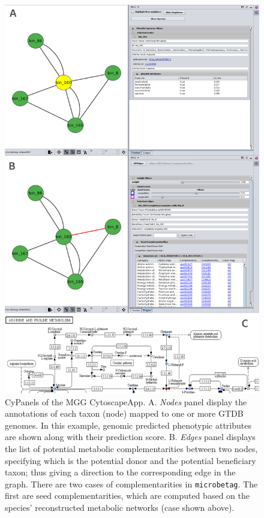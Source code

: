 \documentclass[sn-mathphys,Numbered]{sn-jnl}  %
\theoremstyle{thmstyleone}%
\theoremstyle{thmstyletwo}%
\theoremstyle{thmstylethree}%
\newcommand{\microbetag}{\texttt{microbetag}}
\begin{document}
        \newpage
        \begin{figure}[H]
            \centering
            \includegraphics*[width=0.85\columnwidth]{figs/cyPanel.png}
            \caption{
                CyPanels of the MGG CytoscapeApp. 
                A. \textit{Nodes} panel display the annotations of each taxon (node) mapped to one or more GTDB genomes.
                In this example, genomic predicted phenotypic attributes are shown along with their prediction score.
                B. \textit{Edges} panel displays the list of potential metabolic complementarities between two nodes, specifying which is the potential donor and the potential beneficiary taxon; thus giving a direction to the corresponding edge in the graph. 
                There are two cases of complementarities in \microbetag.
                The first are seed complementarities, which are computed based on the species' reconstructed metabolic networks (case shown above). 
}
\end{figure}
\end{document}
